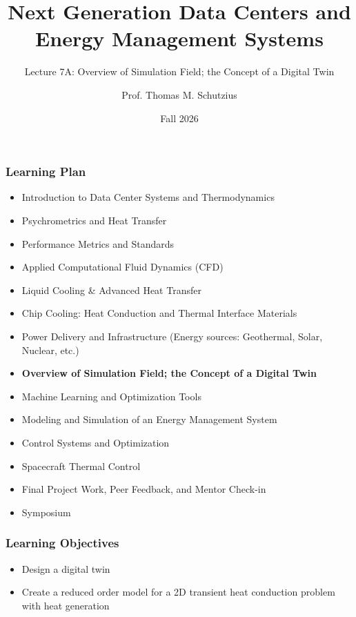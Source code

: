 \documentclass[aspectratio=169,10pt,xcolor={table,dvipsnames},t]{beamer}
\title[lecture 07]{Next Generation Data Centers and Energy Management Systems}
\subtitle{Lecture 7A: Overview of Simulation Field; the Concept of a Digital Twin}
\author{Prof. Thomas M. Schutzius}
\institute{Department of Mechanical Engineering}
\date{Fall 2026}
\begin{document}
\begin{frame}
  \titlepage
\end{frame}


{
\smallframetitle %

\begin{frame}
	\frametitle{Learning Plan}
	\begin{itemize}
		\item Introduction to Data Center Systems and Thermodynamics 
		\item Psychrometrics and Heat Transfer
		\item Performance Metrics and Standards
		\item Applied Computational Fluid Dynamics (CFD)
		\item Liquid Cooling \& Advanced Heat Transfer
		\item Chip Cooling: Heat Conduction and Thermal Interface Materials
		\item Power Delivery and Infrastructure (Energy sources: Geothermal, Solar, Nuclear, etc.)
		\item \textbf{Overview of Simulation Field; the Concept of a Digital Twin}
		\item Machine Learning and Optimization Tools 
		\item Modeling and Simulation of an Energy Management System 
		\item Control Systems and Optimization 
		\item Spacecraft Thermal Control
		\item Final Project Work, Peer Feedback, and Mentor Check-in 
		\item Symposium 
	\end{itemize}		
\end{frame}

\begin{frame}
	\frametitle{Learning Objectives} 
		\begin{itemize}
			\item Design a digital twin
			\item Create a reduced order model for a 2D transient heat conduction problem with heat generation
		\end{itemize}		
\end{frame}


}
\end{document}
